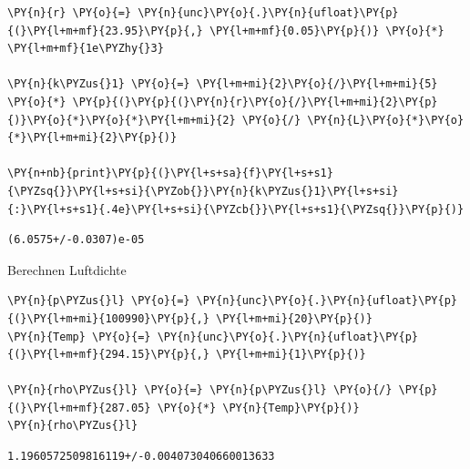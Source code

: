    \begin{tcolorbox}[breakable, size=fbox, boxrule=1pt, pad at break*=1mm,colback=cellbackground, colframe=cellborder]
\begin{Verbatim}[commandchars=\\\{\}]
\PY{n}{r} \PY{o}{=} \PY{n}{unc}\PY{o}{.}\PY{n}{ufloat}\PY{p}{(}\PY{l+m+mf}{23.95}\PY{p}{,} \PY{l+m+mf}{0.05}\PY{p}{)} \PY{o}{*} \PY{l+m+mf}{1e\PYZhy{}3} 

\PY{n}{k\PYZus{}1} \PY{o}{=} \PY{l+m+mi}{2}\PY{o}{/}\PY{l+m+mi}{5} \PY{o}{*} \PY{p}{(}\PY{p}{(}\PY{n}{r}\PY{o}{/}\PY{l+m+mi}{2}\PY{p}{)}\PY{o}{*}\PY{o}{*}\PY{l+m+mi}{2} \PY{o}{/} \PY{n}{L}\PY{o}{*}\PY{o}{*}\PY{l+m+mi}{2}\PY{p}{)} 

\PY{n+nb}{print}\PY{p}{(}\PY{l+s+sa}{f}\PY{l+s+s1}{\PYZsq{}}\PY{l+s+si}{\PYZob{}}\PY{n}{k\PYZus{}1}\PY{l+s+si}{:}\PY{l+s+s1}{.4e}\PY{l+s+si}{\PYZcb{}}\PY{l+s+s1}{\PYZsq{}}\PY{p}{)}
\end{Verbatim}
\end{tcolorbox}

    \begin{Verbatim}[commandchars=\\\{\}]
(6.0575+/-0.0307)e-05
    \end{Verbatim}

    Berechnen Luftdichte

    \begin{tcolorbox}[breakable, size=fbox, boxrule=1pt, pad at break*=1mm,colback=cellbackground, colframe=cellborder]
\begin{Verbatim}[commandchars=\\\{\}]
\PY{n}{p\PYZus{}l} \PY{o}{=} \PY{n}{unc}\PY{o}{.}\PY{n}{ufloat}\PY{p}{(}\PY{l+m+mi}{100990}\PY{p}{,} \PY{l+m+mi}{20}\PY{p}{)}
\PY{n}{Temp} \PY{o}{=} \PY{n}{unc}\PY{o}{.}\PY{n}{ufloat}\PY{p}{(}\PY{l+m+mf}{294.15}\PY{p}{,} \PY{l+m+mi}{1}\PY{p}{)}

\PY{n}{rho\PYZus{}l} \PY{o}{=} \PY{n}{p\PYZus{}l} \PY{o}{/} \PY{p}{(}\PY{l+m+mf}{287.05} \PY{o}{*} \PY{n}{Temp}\PY{p}{)}
\PY{n}{rho\PYZus{}l} 
\end{Verbatim}
\end{tcolorbox}

            \begin{tcolorbox}[breakable, size=fbox, boxrule=.5pt, pad at break*=1mm, opacityfill=0]
\begin{Verbatim}[commandchars=\\\{\}]
1.1960572509816119+/-0.004073040660013633
\end{Verbatim}
\end{tcolorbox}
        
